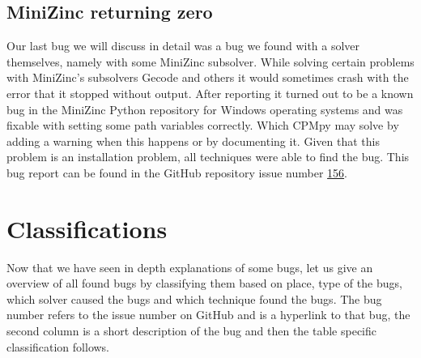 \subsection{MiniZinc returning zero}
\label{res:bug:MinizincZero}
Our last bug we will discuss in detail was a bug we found with a solver themselves, namely with some MiniZinc subsolver. While solving certain problems with MiniZinc’s subsolvers Gecode and others it would sometimes crash with the error that it stopped without output. After reporting it turned out to be a known bug in the MiniZinc Python repository for Windows operating systems and was fixable with setting some path variables correctly. Which CPMpy may solve by adding a warning when this happens or by documenting it.
Given that this problem is an installation problem, all techniques were able to find the bug. This bug report can be found in the GitHub repository issue number \href{https://github.com/CPMpy/cpmpy/issues/156}{156}.

%
%





\section{Classifications}
\label{res:Classifications}
Now that we have seen in depth explanations of some bugs, let us give an overview of all found bugs by classifying them based on place, type of the bugs, which solver caused the bugs and which technique found the bugs. The bug number refers to the issue number on GitHub and is a hyperlink to that bug, the second column is a short description of the bug and then the table specific classification follows.

